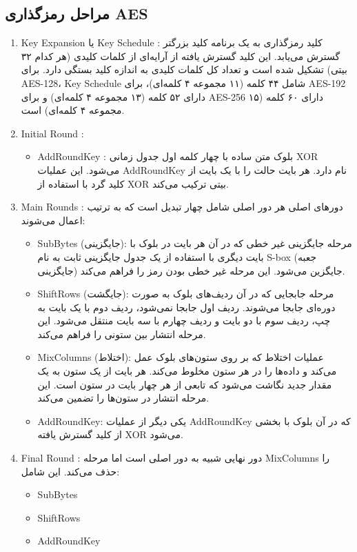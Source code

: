 \subsection*{مراحل رمزگذاری AES}
\begin{enumerate}
    \item Key Expansion 
         یا Key Schedule
         :
         کلید رمزگذاری به یک برنامه کلید بزرگتر گسترش می‌یابد. این کلید گسترش یافته از آرایه‌ای از کلمات کلیدی (هر کدام ۳۲ بیتی) تشکیل شده است و تعداد کل کلمات کلیدی به اندازه کلید بستگی دارد. برای AES-128، Key Schedule شامل ۴۴ کلمه (۱۱ مجموعه ۴ کلمه‌ای)، برای AES-192 دارای ۵۲ کلمه (۱۳ مجموعه ۴ کلمه‌ای) و برای AES-256 دارای ۶۰ کلمه (۱۵ مجموعه ۴ کلمه‌ای) است.
    \item Initial Round
    : 
        \begin{itemize}
            \item AddRoundKey
            : بلوک متن ساده با چهار کلمه اول جدول زمانی XOR می‌شود. این عملیات AddRoundKey نام دارد. هر بایت حالت را با یک بایت از کلید گرد با استفاده از XOR بیتی ترکیب می‌کند.
        \end{itemize}
    \item Main Rounds
    : دورهای اصلی هر دور اصلی شامل چهار تبدیل است که به ترتیب اعمال می‌شوند:
        \begin{itemize}
            \item SubBytes (جایگزینی): مرحله جایگزینی غیر خطی که در آن هر بایت در بلوک با بایت دیگری با استفاده از یک جدول جایگزینی ثابت به نام S-box (جعبه جایگزینی) جایگزین می‌شود. این مرحله غیر خطی بودن رمز را فراهم می‌کند.
            \item ShiftRows (جایگشت): مرحله جابجایی که در آن ردیف‌های بلوک به صورت دوره‌ای جابجا می‌شوند. ردیف اول جابجا نمی‌شود، ردیف دوم با یک بایت به چپ، ردیف سوم با دو بایت و ردیف چهارم با سه بایت منتقل می‌شود. این مرحله انتشار بین ستونی را فراهم می‌کند.
            \item MixColumns (اختلاط): عملیات اختلاط که بر روی ستون‌های بلوک عمل می‌کند و داده‌ها را در هر ستون مخلوط می‌کند. هر بایت از یک ستون به یک مقدار جدید نگاشت می‌شود که تابعی از هر چهار بایت در ستون است. این مرحله انتشار در ستون‌ها را تضمین می‌کند.
            \item AddRoundKey: یکی دیگر از عملیات AddRoundKey که در آن بلوک با بخشی از کلید گسترش یافته XOR می‌شود.
        \end{itemize}
    \item Final Round
    : دور نهایی شبیه به دور اصلی است اما مرحله MixColumns را حذف می‌کند. این شامل:
        \begin{itemize}
            \item SubBytes
            \item ShiftRows
            \item AddRoundKey
        \end{itemize}
\end{enumerate}


